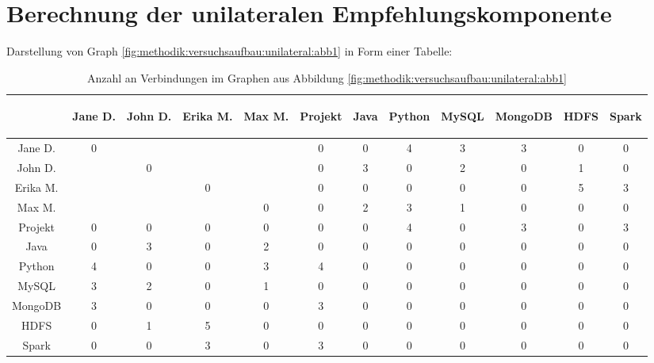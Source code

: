 \section{Berechnung der unilateralen Empfehlungskomponente}
\label{ch:nebenrechnungen:unilateral}
Darstellung von Graph \ref{fig:methodik:versuchsaufbau:unilateral:abb1} in Form einer Tabelle:
\begin{table}[h]
	\centering
	\begin{tabular}{c|c|c|c|c|c|c|c|c|c|c|c}
		& \begin{sideways}Jane D.\end{sideways} & \begin{sideways}John D.\end{sideways} & \begin{sideways}Erika M.\end{sideways} & \begin{sideways}Max M.\end{sideways} & \begin{sideways}Projekt\end{sideways} & \begin{sideways}Java\end{sideways} & \begin{sideways}Python\end{sideways} & \begin{sideways}MySQL\end{sideways} & \begin{sideways}MongoDB\end{sideways} & \begin{sideways}HDFS\end{sideways} & \begin{sideways}Spark\end{sideways} \\
		\hline
		Jane D.  & 0 & \kantengewicht & \kantengewicht & \kantengewicht & 0 & 0 & 4 & 3 & 3 & 0 & 0\\
		John D.  & \kantengewicht & 0 & \kantengewicht & \kantengewicht & 0 & 3 & 0 & 2 & 0 & 1 & 0\\
		Erika M. & \kantengewicht & \kantengewicht & 0 & \kantengewicht & 0 & 0 & 0 & 0 & 0 & 5 & 3\\
		Max M.   & \kantengewicht & \kantengewicht & \kantengewicht & 0 & 0 & 2 & 3 & 1 & 0 & 0 & 0\\
		Projekt  & 0 & 0 & 0 & 0 & 0 & 0 & 4 & 0 & 3 & 0 & 3\\
		Java     & 0 & 3 & 0 & 2 & 0 & 0 & 0 & 0 & 0 & 0 & 0\\
		Python   & 4 & 0 & 0 & 3 & 4 & 0 & 0 & 0 & 0 & 0 & 0\\
		MySQL    & 3 & 2 & 0 & 1 & 0 & 0 & 0 & 0 & 0 & 0 & 0\\
		MongoDB  & 3 & 0 & 0 & 0 & 3 & 0 & 0 & 0 & 0 & 0 & 0\\
		HDFS     & 0 & 1 & 5 & 0 & 0 & 0 & 0 & 0 & 0 & 0 & 0\\
		Spark    & 0 & 0 & 3 & 0 & 3 & 0 & 0 & 0 & 0 & 0 & 0
	\end{tabular}
	\caption{Anzahl an Verbindungen im Graphen aus Abbildung \ref{fig:methodik:versuchsaufbau:unilateral:abb1}}
	\label{tbl:berechnungDerKatzZentralitaetPseudoMitarbeiter:tbl1}
\end{table}

